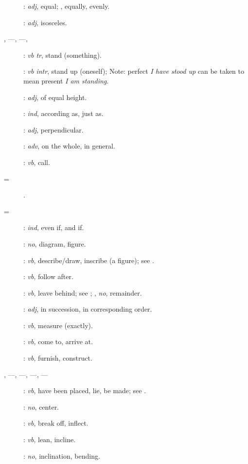 {\begin{description}
\item[]: {\em adj}, equal; , equally, evenly.
\item[]: {\em adj}, isosceles.
\item[, ---, ---, ]: {\em vb tr}, 
stand (something).
\item[]: {\em vb intr}, 
stand up (oneself); Note: perfect {\em I have stood up} can be taken to mean present {\em I am standing}.
\item[]: {\em adj}, of equal height.
\item[]: {\em ind}, according as, just as.
\item[]: {\em adj}, perpendicular.
\item[]: {\em adv}, on the whole, in general.
\item[]: {\em vb}, call.
\item[ = ].
\item[ = ]: {\em ind}, even if, and if.
\item[]: {\em no}, diagram, figure.
\item[]: {\em vb}, describe/draw, inscribe (a figure); see .
\item[]: {\em vb}, follow after.
\item[] : {\em vb}, leave behind; see ; , {\em no},
remainder. 
\item[]: {\em adj}, in succession, in corresponding order.
\item[]: {\em vb}, measure (exactly).
\item[]: {\em vb}, come to, arrive at.
\item[]: {\em vb}, furnish, construct.
\item[, ---, ---, ---, ---]: {\em vb}, have been placed,
lie, be made; see .
\item[]: {\em no}, center.
\item[]: {\em vb}, break off, inflect.
\item[]: {\em vb}, lean, incline.
\item[]: {\em no}, inclination, bending.

\end{description}}
